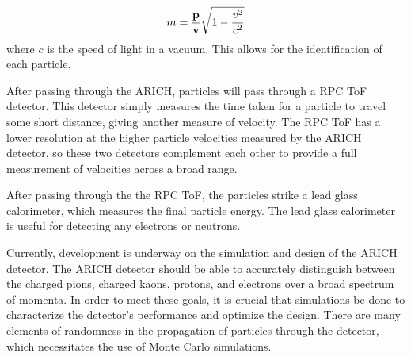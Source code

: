 \begin{equation}
    \label{eq:relMass}
    m = \frac{\bf{p}}{\bf{v}}\sqrt{1-\frac{v^2}{c^2}}
\end{equation}
where $c$ is the speed of light in a vacuum. This allows for the identification of each particle.

After passing through the \ac{ARICH}, particles will pass through a \ac{RPC ToF} detector.
This detector simply measures the time taken for a particle to travel some short distance, giving another measure of velocity.
The \ac{RPC ToF} has a lower resolution at the higher particle velocities measured by the \ac{ARICH} detector, so these two detectors complement each other to provide a full measurement of velocities across a broad range.

After passing through the the \ac{RPC ToF}, the particles strike a lead glass calorimeter, which measures the final particle energy.
The lead glass calorimeter is useful for detecting any electrons or neutrons.

Currently, development is underway on the simulation and design of the \ac{ARICH} detector.
The \ac{ARICH} detector should be able to accurately distinguish between the charged pions, charged kaons, protons, and electrons over a broad spectrum of momenta.
In order to meet these goals, it is crucial that simulations be done to characterize the detector's performance and optimize the design.
There are many elements of randomness in the propagation of particles through the detector, which necessitates the use of Monte Carlo simulations. 




\endinput

Any text after an \endinput is ignored.
You could put scraps here or things in progress.
